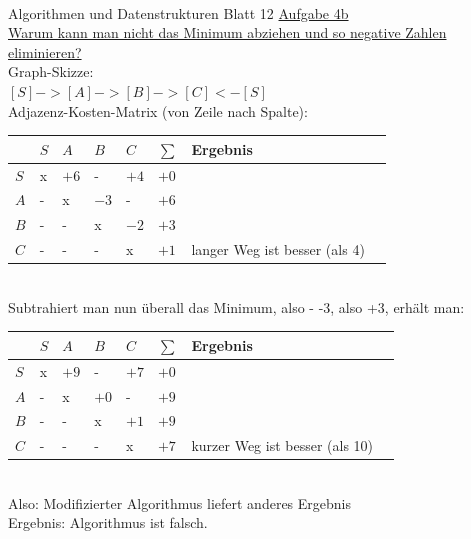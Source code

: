 \documentclass[12pt]{article} %
\newcommand{\aufgabe}[2]{{\LARGE Algorithmen und Datenstrukturen Blatt #1 \underline{Aufgabe #2}}\\[3.5ex]  }
\newcommand{\aufgabenstellung}[1]{\underline {#1}\\[2ex]}
\begin{document}
\- \dotfill \\[4ex] \hspace*{1em}
\aufgabe{12}{4b}
\aufgabenstellung{Warum kann man nicht das Minimum abziehen und so negative Zahlen eliminieren?}
Graph-Skizze: \\
$[S] -> [A] -> [B] -> [C] <- [S]$ \\[2ex]
Adjazenz-Kosten-Matrix (von Zeile nach Spalte):  \\[1ex]
\begin{tabular}{| l | l | l | l | l | l | l  l |} 
\hline
 & $S$ & $ A$ & $B$ & $C$ & $\sum$ & Ergebnis & \\ \hline
$S$ & x & $+6$ & - & $+4$ & $+0$ &  & \\ \hline
$A$ & - &  x & $-3$ & - & $+6$ &  & \\ \hline
$B$ & - &  - & x & $-2$ & $+3$ &  & \\ \hline
$C$ & - &  - & - & x & $+1$ & langer Weg ist besser (als 4) & \\ \hline
\end{tabular} \\[2ex]
Subtrahiert man nun überall das Minimum, also - -3, also +3, erhält man: \\[2ex]
\begin{tabular}{| l | l | l | l | l | l | l  l |} 
\hline
 & $S$ & $ A$ & $B$ & $C$ & $\sum$ & Ergebnis & \\ \hline
$S$ & x & $+9$ & - & $+7$ & $+0$ &  & \\ \hline
$A$ & - &  x & $+0$ & - & $+9$ &  & \\ \hline
$B$ & - &  - & x & $+1$ & $+9$ &  & \\ \hline
$C$ & - &  - & - & x & $+7$ & kurzer Weg ist besser (als 10) & \\ \hline
\end{tabular} \\[2ex]
Also: Modifizierter Algorithmus liefert anderes Ergebnis \\
Ergebnis: Algorithmus ist falsch.\\
\end{document}
